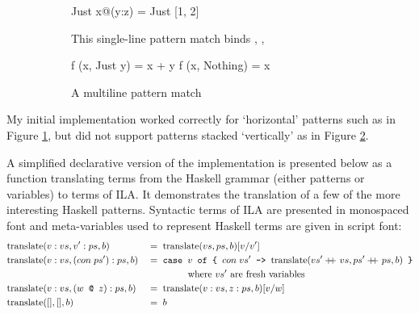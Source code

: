 \documentclass[dissertation.tex]{subfiles}
\begin{document}
{{{            \begin{figure}[h]
            \centering
            \begin{subfigure}[t]{0.4\textwidth}
            \begin{haskellfigure}
            Just x@(y:z) = Just [1, 2]
            \end{haskellfigure}
            \caption{This single-line pattern match binds , , }
            \label{fig:pattern-horizontal}
            \end{subfigure}
            \hspace{5mm}
            \begin{subfigure}[t]{0.4\textwidth}
            \begin{haskellfigure}
            f (x, Just y) = x + y
            f (x, Nothing) = x
            \end{haskellfigure}
            \caption{A multiline pattern match}
            \label{fig:pattern-vertical}
            \end{subfigure}
            \caption{}
            \label{fig:patterns}
            \end{figure}

            My initial implementation worked correctly for `horizontal' patterns such as in Figure \ref{fig:pattern-horizontal}, but did not support patterns stacked `vertically' as in Figure \ref{fig:pattern-vertical}.

            A simplified declarative version of the implementation is presented below as a function translating terms from the Haskell grammar (either patterns or variables) to terms of ILA. It demonstrates the translation of a few of the more interesting Haskell patterns. Syntactic terms of ILA are presented in monospaced font and meta-variables used to represent Haskell terms are given in script font:
            \begin{alignat*}{2}
            \text{translate} & (v:vs, v':ps, b) && =\; \text{translate} (vs, ps, b) [v/v'] \\
            \text{translate} & (v:vs, (con\;ps'):ps, b) && =\; \texttt{case } v \texttt{ of \{ }con\;vs'\texttt{ -> }
            \text{translate} (vs' +\kern-1.3ex+\kern0.8ex vs, ps' +\kern-1.3ex+\kern0.8ex ps, b) \texttt{ \}} \\
            & && \hspace{1.5cm}\text{where } vs' \text{ are fresh variables} \\
            \text{translate} & (v:vs, (w \texttt{ @ } z):ps, b) && =\; \text{translate} (v:vs, z:ps, b) [v/w] \\
            \text{translate} & ([], [], b) && =\; b
            \end{alignat*}

}}}
\end{document}
